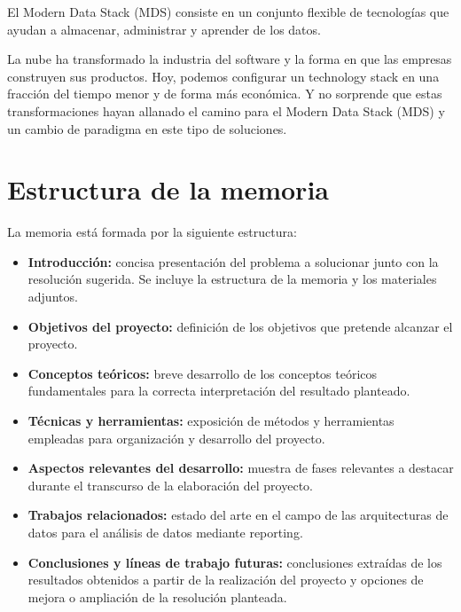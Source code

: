 El Modern Data Stack (MDS) consiste en un conjunto flexible de tecnologías que ayudan a almacenar, administrar y aprender de los datos.

La nube ha transformado la industria del software y la forma en que las empresas construyen sus productos. Hoy, podemos configurar un technology stack en una fracción del tiempo menor y de forma más económica. Y no sorprende que estas transformaciones hayan allanado el camino para el Modern Data Stack (MDS) y un cambio de paradigma en este tipo de soluciones. 

\section{Estructura de la memoria}\label{estructura-de-la-memoria}
La memoria está formada por la siguiente estructura:
\begin{itemize}
\tightlist
\item
  \textbf{Introducción:} concisa presentación del problema a solucionar junto con la resolución sugerida. Se incluye la estructura de la memoria y los materiales adjuntos.
\item
  \textbf{Objetivos del proyecto:} definición de los objetivos que
  pretende alcanzar el proyecto.
\item
  \textbf{Conceptos teóricos:} breve desarrollo de los conceptos
  teóricos fundamentales para la correcta interpretación del resultado planteado.
\item
  \textbf{Técnicas y herramientas:} exposición de métodos y
  herramientas empleadas para organización y desarrollo del proyecto.
\item
  \textbf{Aspectos relevantes del desarrollo:} muestra de fases
  relevantes a destacar durante el transcurso de la elaboración del proyecto.
\item
  \textbf{Trabajos relacionados:} estado del arte en el campo de las arquitecturas de datos para el análisis de datos mediante reporting.
\item
  \textbf{Conclusiones y líneas de trabajo futuras:} conclusiones
  extraídas de los resultados obtenidos a partir de la realización del proyecto y opciones de mejora o
  ampliación de la resolución planteada.
\end{itemize}

